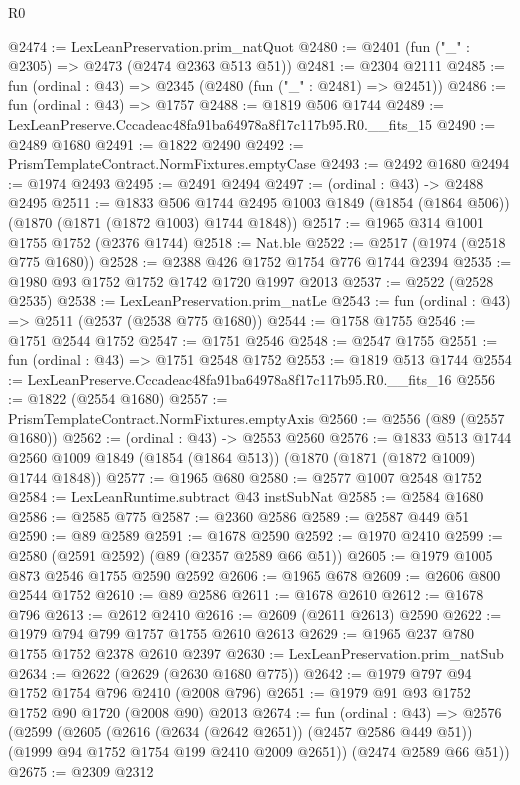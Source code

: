 \begin{lexlean}{R0}
\begin{coremodule}
@2474 := LexLeanPreservation.prim_natQuot
@2480 := @2401 (fun ("_" : @2305) => @2473 (@2474 @2363 @513 @51))
@2481 := @2304 @2111
@2485 := fun (ordinal : @43) => @2345 (@2480 (fun ("_" : @2481) => @2451))
@2486 := fun (ordinal : @43) => @1757
@2488 := @1819 @506 @1744
@2489 := LexLeanPreserve.Cccadeac48fa91ba64978a8f17c117b95.R0.__fits_15
@2490 := @2489 @1680
@2491 := @1822 @2490
@2492 := PrismTemplateContract.NormFixtures.emptyCase
@2493 := @2492 @1680
@2494 := @1974 @2493
@2495 := @2491 @2494
@2497 := (ordinal : @43) -> @2488 @2495
@2511 := @1833
    @506
    @1744
    @2495
    @1003
    @1849
    (@1854 (@1864 @506))
    (@1870 (@1871 (@1872 @1003) @1744 @1848))
@2517 := @1965 @314 @1001 @1755 @1752 (@2376 @1744)
@2518 := Nat.ble
@2522 := @2517 (@1974 (@2518 @775 @1680))
@2528 := @2388 @426 @1752 @1754 @776 @1744 @2394
@2535 := @1980 @93 @1752 @1752 @1742 @1720 @1997 @2013
@2537 := @2522 (@2528 @2535)
@2538 := LexLeanPreservation.prim_natLe
@2543 := fun (ordinal : @43) => @2511 (@2537 (@2538 @775 @1680))
@2544 := @1758 @1755
@2546 := @1751 @2544 @1752
@2547 := @1751 @2546
@2548 := @2547 @1755
@2551 := fun (ordinal : @43) => @1751 @2548 @1752
@2553 := @1819 @513 @1744
@2554 := LexLeanPreserve.Cccadeac48fa91ba64978a8f17c117b95.R0.__fits_16
@2556 := @1822 (@2554 @1680)
@2557 := PrismTemplateContract.NormFixtures.emptyAxis
@2560 := @2556 (@89 (@2557 @1680))
@2562 := (ordinal : @43) -> @2553 @2560
@2576 := @1833
    @513
    @1744
    @2560
    @1009
    @1849
    (@1854 (@1864 @513))
    (@1870 (@1871 (@1872 @1009) @1744 @1848))
@2577 := @1965 @680
@2580 := @2577 @1007 @2548 @1752
@2584 := LexLeanRuntime.subtract @43 instSubNat
@2585 := @2584 @1680
@2586 := @2585 @775
@2587 := @2360 @2586
@2589 := @2587 @449 @51
@2590 := @89 @2589
@2591 := @1678 @2590
@2592 := @1970 @2410
@2599 := @2580 (@2591 @2592) (@89 (@2357 @2589 @66 @51))
@2605 := @1979 @1005 @873 @2546 @1755 @2590 @2592
@2606 := @1965 @678
@2609 := @2606 @800 @2544 @1752
@2610 := @89 @2586
@2611 := @1678 @2610
@2612 := @1678 @796
@2613 := @2612 @2410
@2616 := @2609 (@2611 @2613) @2590
@2622 := @1979 @794 @799 @1757 @1755 @2610 @2613
@2629 := @1965 @237 @780 @1755 @1752 @2378 @2610 @2397
@2630 := LexLeanPreservation.prim_natSub
@2634 := @2622 (@2629 (@2630 @1680 @775))
@2642 := @1979 @797 @94 @1752 @1754 @796 @2410 (@2008 @796)
@2651 := @1979 @91 @93 @1752 @1752 @90 @1720 (@2008 @90) @2013
@2674 := fun (ordinal : @43) =>
  @2576
    (@2599
      (@2605
        (@2616 (@2634 (@2642 @2651)) (@2457 @2586 @449 @51))
        (@1999 @94 @1752 @1754 @199 @2410 @2009 @2651))
      (@2474 @2589 @66 @51))
@2675 := @2309 @2312

\end{coremodule}
\end{lexlean}
